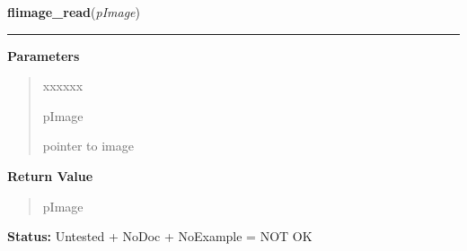 \hspace{.8\funcindent}\begin{boxedminipage}{\funcwidth}

    \raggedright \textbf{flimage\_read}(\textit{pImage})

    \vspace{-1.5ex}

    \rule{\textwidth}{0.5\fboxrule}
\setlength{\parskip}{2ex}
\setlength{\parskip}{1ex}
      \textbf{Parameters}
      \vspace{-1ex}

      \begin{quote}
        \begin{Ventry}{xxxxxx}

          \item[pImage]

          pointer to image

        \end{Ventry}

      \end{quote}

      \textbf{Return Value}
    \vspace{-1ex}

      \begin{quote}
      pImage

      \end{quote}

\textbf{Status:} Untested + NoDoc + NoExample = NOT OK



    \end{boxedminipage}

    \label{xformslib:library:flimage_dump}

    \vspace{0.5ex}

